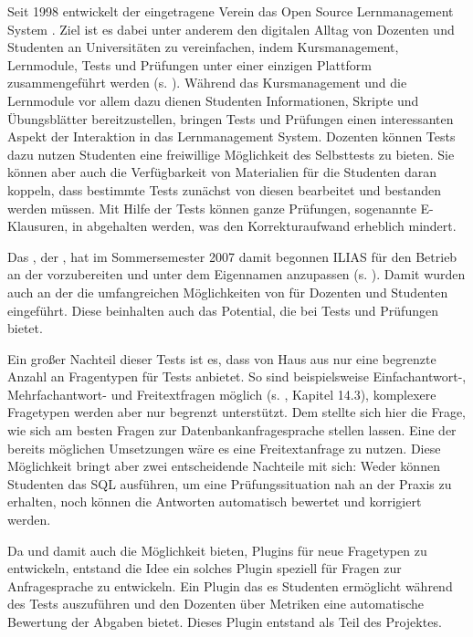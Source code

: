 Seit 1998 entwickelt der eingetragene Verein  das Open Source Lernmanagement System . Ziel ist es dabei unter anderem den digitalen Alltag von Dozenten und Studenten an Universitäten zu vereinfachen, indem Kursmanagement, Lernmodule, Tests und Prüfungen unter einer einzigen Plattform zusammengeführt werden (s. \cite{Ilias1998}). Während das Kursmanagement und die Lernmodule vor allem dazu dienen Studenten Informationen, Skripte und Übungsblätter bereitzustellen, bringen Tests und Prüfungen einen interessanten Aspekt der Interaktion in das Lernmanagement System. Dozenten können Tests dazu nutzen Studenten eine freiwillige Möglichkeit des Selbsttests zu bieten. Sie können aber auch die Verfügbarkeit von Materialien für die Studenten daran koppeln, dass bestimmte Tests zunächst von diesen bearbeitet und bestanden werden müssen. Mit Hilfe der Tests können ganze Prüfungen, sogenannte E-Klausuren, in  abgehalten werden, was den Korrekturaufwand erheblich mindert.

Das  , der  , hat im Sommersemester 2007 damit begonnen ILIAS für den Betrieb an der  vorzubereiten und unter dem Eigennamen  anzupassen (s. \cite{Studon2007}). Damit wurden auch an der  die umfangreichen Möglichkeiten von  für Dozenten und Studenten eingeführt. Diese beinhalten auch das Potential, die  bei Tests und Prüfungen bietet. 

Ein großer Nachteil dieser Tests ist es, dass  von Haus aus nur eine begrenzte Anzahl an Fragentypen für Tests anbietet. So sind beispielsweise Einfachantwort-, Mehrfachantwort- und Freitextfragen möglich (s. \cite{IliasAutorenDokumentation}, Kapitel 14.3), komplexere Fragetypen werden aber nur begrenzt unterstützt. Dem  stellte sich hier die Frage, wie sich am besten Fragen zur Datenbankanfragesprache  stellen lassen. Eine der bereits möglichen Umsetzungen wäre es eine Freitextanfrage zu nutzen. Diese Möglichkeit bringt aber zwei entscheidende Nachteile mit sich: Weder können Studenten das SQL ausführen, um eine Prüfungssituation nah an der Praxis zu erhalten, noch können die Antworten automatisch bewertet und korrigiert werden.

Da  und damit auch  die Möglichkeit bieten, Plugins für neue Fragetypen zu entwickeln, entstand die Idee ein solches Plugin speziell für Fragen zur Anfragesprache  zu entwickeln. Ein Plugin das es Studenten ermöglicht  während des Tests auszuführen und den Dozenten über Metriken eine automatische Bewertung der Abgaben bietet. Dieses Plugin entstand als Teil des  Projektes.